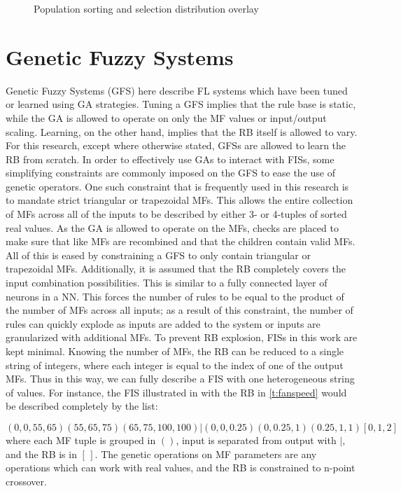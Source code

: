 \begin{figure}
    \centering
    
    \caption{Population sorting and selection distribution overlay}\label{f:sort-select}
\end{figure}
    
\section{Genetic Fuzzy Systems}
Genetic Fuzzy Systems (GFS) here describe FL systems which have been tuned or learned using GA strategies.
Tuning a GFS implies that the rule base is static, while the GA is allowed to operate on only the MF values or
input/output scaling. Learning, on the other hand, implies that the RB itself is allowed to vary. For this
research, except where otherwise stated, GFSs are allowed to learn the RB from scratch. In order to
effectively use GAs to interact with FISs, some simplifying constraints are commonly imposed on the GFS to
ease the use of genetic operators. One such constraint that is frequently used in this research is to mandate
strict triangular or trapezoidal MFs. This allows the entire collection of MFs across all of the inputs to be
described by either 3- or 4-tuples of sorted real values. As the GA is allowed to operate on the MFs, checks
are placed to make sure that like MFs are recombined and that the children contain valid MFs.  All of this is
eased by constraining a GFS to only contain triangular or trapezoidal MFs. Additionally, it is assumed that
the RB completely covers the input combination possibilities. This is similar to a fully connected layer of
neurons in a NN. This forces the number of rules to be equal to the product of the number of MFs across all
inputs; as a result of this constraint, the number of rules can quickly explode as inputs are added to the
system or inputs are granularized with additional MFs. To prevent RB explosion, FISs in this work are kept
minimal. Knowing the number of MFs, the RB can be reduced to a single string of integers, where each integer
is equal to the index of one of the output MFs. Thus in this way, we can fully describe a FIS with one
heterogeneous string of values. For instance, the FIS illustrated in  with
the RB in \cref{t:fanspeed} would be described completely by the list:

\begin{equation*}
    \left(0, 0, 55, 65\right) \left(55, 65, 75\right) \left(65, 75, 100, 100\right)
    |\left(0, 0, 0.25\right) \left(0, 0.25, 1\right) \left(0.25, 1, 1\right)
    \left[0, 1, 2\right]
\end{equation*}
where each MF tuple is grouped in $\left(\right)$, input is separated from output with $|$, and the RB is in
$\left[\,\right]$. The genetic operations on MF parameters are any operations which can work with real values,
and the RB is constrained to n-point crossover.

